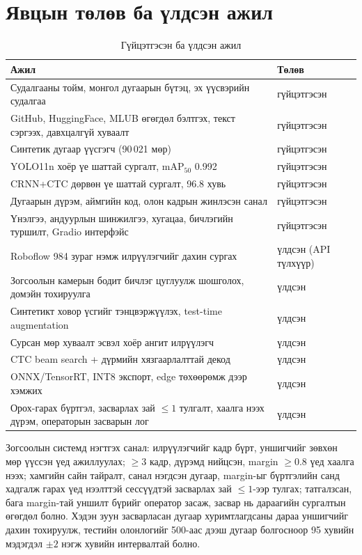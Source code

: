 \section{Явцын төлөв ба үлдсэн ажил}
\begin{table}[H]\centering\caption{Гүйцэтгэсэн ба үлдсэн ажил}\label{tab:todo}\small
\begin{tabular}{p{9cm}l}\toprule
Ажил & Төлөв\\\midrule
Судалгааны тойм, монгол дугаарын бүтэц, эх үүсвэрийн судалгаа & гүйцэтгэсэн\\
GitHub, HuggingFace, MLUB өгөгдөл бэлтгэх, текст сэргээх, давхцалгүй хуваалт & гүйцэтгэсэн\\
Синтетик дугаар үүсгэгч (90\,021 мөр) & гүйцэтгэсэн\\
YOLO11n хоёр үе шаттай сургалт, mAP$_{50}$ 0.992 & гүйцэтгэсэн\\
CRNN+CTC дөрвөн үе шаттай сургалт, 96.8 хувь & гүйцэтгэсэн\\
Дугаарын дүрэм, аймгийн код, олон кадрын жинлэсэн санал & гүйцэтгэсэн\\
Үнэлгээ, андуурлын шинжилгээ, хугацаа, бичлэгийн туршилт, Gradio интерфэйс & гүйцэтгэсэн\\
Roboflow 984 зураг нэмж илрүүлэгчийг дахин сургах & үлдсэн (API түлхүүр)\\
Зогсоолын камерын бодит бичлэг цуглуулж шошголох, домэйн тохируулга & үлдсэн\\
Синтетикт ховор үсгийг тэнцвэржүүлэх, test-time augmentation & үлдсэн\\
Сурсан мөр хуваалт эсвэл хоёр ангит илрүүлэгч & үлдсэн\\
CTC beam search + дүрмийн хязгаарлалттай декод & үлдсэн\\
ONNX/TensorRT, INT8 экспорт, edge төхөөрөмж дээр хэмжих & үлдсэн\\
Орох-гарах бүртгэл, засварлах зай $\le1$ тулгалт, хаалга нээх дүрэм, операторын засварын лог & үлдсэн\\\bottomrule
\end{tabular}\end{table}
Зогсоолын системд нэгтгэх санал: илрүүлэгчийг кадр бүрт, уншигчийг зөвхөн мөр үүссэн үед ажиллуулах; $\ge3$ кадр, дүрэмд нийцсэн, margin $\ge0.8$ үед хаалга нээх; хамгийн сайн тайралт, санал нэгдсэн дугаар, margin-ыг бүртгэлийн санд хадгалж гарах үед нээлттэй сессүүдтэй засварлах зай $\le1$-ээр тулгах; татгалзсан, бага margin-тай уншилт бүрийг оператор засаж, засвар нь дараагийн сургалтын өгөгдөл болно. Хэдэн зуун засварласан дугаар хуримтлагдсаны дараа уншигчийг дахин тохируулж, тестийн олонлогийг 500-аас дээш дугаар болгосноор 95 хувийн мэдэгдэл $\pm2$ нэгж хувийн интервалтай болно.
